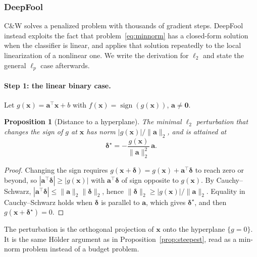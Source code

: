 \documentclass[10pt,a4paper]{extarticle}
\newtheorem{proposition}[theorem]{Proposition}
\theoremstyle{definition}
\newcommand{\x}{\mathbf{x}}
\newcommand{\bdelta}{\boldsymbol{\delta}}
\DeclareMathOperator{\sign}{sign}
\begin{document}
\subsubsection{DeepFool}\label{sec:deepfool}

C\&W solves a penalized problem with thousands of gradient steps. DeepFool \citep{moosavi2016deepfool} instead exploits the fact that problem~\eqref{eq:minnorm} has a closed-form solution when the classifier is linear, and applies that solution repeatedly to the local linearization of a nonlinear one. We write the derivation for \(\ell_2\) and state the general \(\ell_p\) case afterwards.

\paragraph{Step 1: the linear binary case.} Let \(g(\x)=\mathbf{a}^\top\x+b\) with \(f(\x)=\sign(g(\x))\), \(\mathbf{a}\neq\mathbf{0}\).

\begin{proposition}[Distance to a hyperplane]\label{prop:hyperplane}
The minimal \(\ell_2\) perturbation that changes the sign of \(g\) at \(\x\) has norm \(|g(\x)|/\|\mathbf{a}\|_2\), and is attained at
\[
\bdelta^\star=-\frac{g(\x)}{\|\mathbf{a}\|_2^2}\,\mathbf{a}.
\]
\end{proposition}

\begin{proof}
Changing the sign requires \(g(\x+\bdelta)=g(\x)+\mathbf{a}^\top\bdelta\) to reach zero or beyond, so \(|\mathbf{a}^\top\bdelta|\ge|g(\x)|\) with \(\mathbf{a}^\top\bdelta\) of sign opposite to \(g(\x)\). By Cauchy--Schwarz, \(|\mathbf{a}^\top\bdelta|\le\|\mathbf{a}\|_2\|\bdelta\|_2\), hence \(\|\bdelta\|_2\ge|g(\x)|/\|\mathbf{a}\|_2\). Equality in Cauchy--Schwarz holds when \(\bdelta\) is parallel to \(\mathbf{a}\), which gives \(\bdelta^\star\), and then \(g(\x+\bdelta^\star)=0\).
\end{proof}

The perturbation is the orthogonal projection of \(\x\) onto the hyperplane \(\{g=0\}\). It is the same Hölder argument as in Proposition~\ref{prop:steepest}, read as a min-norm problem instead of a budget problem.
\end{document}
